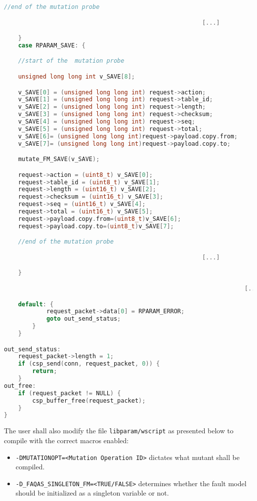 \begin{lstlisting}[language=c]
    //end of the mutation probe

														[...]

	}
	case RPARAM_SAVE: {

    //start of the  mutation probe

    unsigned long long int v_SAVE[8];

    v_SAVE[0] = (unsigned long long int) request->action;
    v_SAVE[1] = (unsigned long long int) request->table_id;
    v_SAVE[2] = (unsigned long long int) request->length;
    v_SAVE[3] = (unsigned long long int) request->checksum;
    v_SAVE[4] = (unsigned long long int) request->seq;
    v_SAVE[5] = (unsigned long long int) request->total;
    v_SAVE[6]= (unsigned long long int)request->payload.copy.from;
    v_SAVE[7]= (unsigned long long int)request->payload.copy.to;

    mutate_FM_SAVE(v_SAVE);

    request->action = (uint8_t) v_SAVE[0];
    request->table_id = (uint8_t) v_SAVE[1];
    request->length = (uint16_t) v_SAVE[2];
    request->checksum = (uint16_t) v_SAVE[3];
    request->seq = (uint16_t) v_SAVE[4];
    request->total = (uint16_t) v_SAVE[5];
    request->payload.copy.from=(uint8_t)v_SAVE[6];
    request->payload.copy.to=(uint8_t)v_SAVE[7];

    //end of the mutation probe

          												[...]

	}

																	[...]

	default: {
            request_packet->data[0] = RPARAM_ERROR;
            goto out_send_status;
        }
    }

out_send_status:
    request_packet->length = 1;
    if (csp_send(conn, request_packet, 0)) {
        return;
    }
out_free:
    if (request_packet != NULL) {
        csp_buffer_free(request_packet);
    }
}
\end{lstlisting}

The user shall also modify the file \texttt{libparam/wscript} as presented below to compile with the correct macros enabled:
\begin{itemize}
	\item \texttt{-DMUTATIONOPT=<Mutation Operation ID>} dictates what mutant shall be compiled.
	\item \texttt{-D\_FAQAS\_SINGLETON\_FM=<TRUE/FALSE>} determines whether the fault model should be initialized as a singleton variable or not.
\end{itemize}

